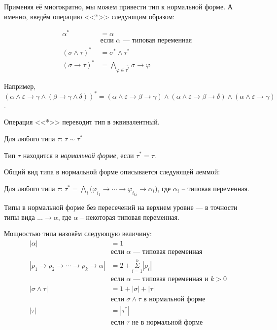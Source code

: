 \documentclass[../main.tex]{subfiles}
\begin{document}
Применяя её многократно, мы можем привести тип к нормальной форме. А именно, введём операцию <<*>> следующим образом: 

\begin{definition}
\begin{align*}
\alpha^* &= \alpha \\
    &\text{если $\alpha$ --- типовая переменная }\\
(\sigma \wedge \tau)^* &= \sigma^* \wedge \tau^*\\
(\sigma \to \tau)^* &= \bigwedge \limits_{\varphi \in \hat{\tau^*}} \sigma \to \varphi
\end{align*}
\end{definition}

Например, $(\alpha \wedge \varepsilon \to \gamma \wedge (\beta \to \gamma \wedge \delta))^* = (\alpha \wedge \varepsilon \to \beta \to \gamma) \wedge (\alpha \wedge \varepsilon \to \beta \to \delta) \wedge (\alpha \wedge \varepsilon \to \gamma)$.

Операция <<*>> переводит тип в эквивалентный.

\begin{lemma} \label{normal form}
Для любого типа $\tau$: $\tau \sim \tau^*$
\end{lemma}


\begin{definition}
Тип $\tau$ находится в {\it нормальной форме}, если $\tau^* = \tau$.
\end{definition}

Общий вид типа в нормальной форме описывается следующей леммой:

\begin{lemma} \label{normal form form}
Для любого типа $\tau$: $\tau^* = \bigwedge \limits_i (\varphi_i_1 \to \cdots \to \varphi_i_{k i} \to \alpha_i$), где $\alpha_i$ -- типовая переменная.
\end{lemma}

\begin{corollary} \label{normal form unit}
Типы в нормальной форме без пересечений на верхнем уровне --- в точности типы вида $\dots \to \alpha$, где $\alpha$ -- некоторая типовая переменная.
\end{corollary}

\begin{definition} \label{typesize}
Мощностью типа назовём следующую величину: 
\begin{align*}
|\alpha| &= 1 \\
         &\text{если $\alpha$ --- типовая переменная }\\
|\rho_1 \to \rho_2 \to \cdots \to \rho_k \to \alpha| &= 2 + \Sigma\limits_{i = 1}^k |\rho_i|\\
                                                     &\text{если $\alpha$ --- типовая переменная и $k > 0$}\\
|\sigma \wedge \tau| &= 1 + |\sigma| + |\tau|\\
    &\text{если $\sigma \wedge \tau$ в нормальной форме}\\
|\tau| &= |\tau^*|\\
       &\text{если $\tau$ не в нормальной форме}
\end{align*}
\end{definition}
\end{document}
